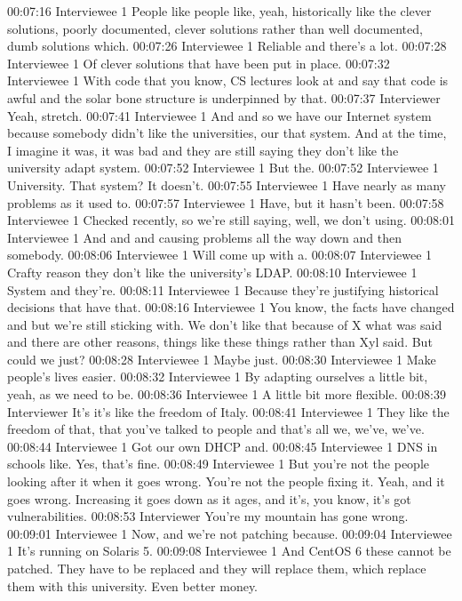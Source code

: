 00:07:16 Interviewee 1
People like people like, yeah, historically like the clever solutions, poorly documented, clever solutions rather than well documented, dumb solutions which.
00:07:26 Interviewee 1
Reliable and there's a lot.
00:07:28 Interviewee 1
Of clever solutions that have been put in place.
00:07:32 Interviewee 1
With code that you know, CS lectures look at and say that code is awful and the solar bone structure is underpinned by that.
00:07:37 Interviewer
Yeah, stretch.
00:07:41 Interviewee 1
And and so we have our Internet system because somebody didn't like the universities, our that system. And at the time, I imagine it was, it was bad and they are still saying they don't like the university adapt system.
00:07:52 Interviewee 1
But the.
00:07:52 Interviewee 1
University. That system? It doesn't.
00:07:55 Interviewee 1
Have nearly as many problems as it used to.
00:07:57 Interviewee 1
Have, but it hasn't been.
00:07:58 Interviewee 1
Checked recently, so we're still saying, well, we don't using.
00:08:01 Interviewee 1
And and and causing problems all the way down and then somebody.
00:08:06 Interviewee 1
Will come up with a.
00:08:07 Interviewee 1
Crafty reason they don't like the university's LDAP.
00:08:10 Interviewee 1
System and they're.
00:08:11 Interviewee 1
Because they're justifying historical decisions that have that.
00:08:16 Interviewee 1
You know, the facts have changed and but we're still sticking with. We don't like that because of X what was said and there are other reasons, things like these things rather than Xyl said. But could we just?
00:08:28 Interviewee 1
Maybe just.
00:08:30 Interviewee 1
Make people's lives easier.
00:08:32 Interviewee 1
By adapting ourselves a little bit, yeah, as we need to be.
00:08:36 Interviewee 1
A little bit more flexible.
00:08:39 Interviewer
It's it's like the freedom of Italy.
00:08:41 Interviewee 1
They like the freedom of that, that you've talked to people and that's all we, we've, we've.
00:08:44 Interviewee 1
Got our own DHCP and.
00:08:45 Interviewee 1
DNS in schools like. Yes, that's fine.
00:08:49 Interviewee 1
But you're not the people looking after it when it goes wrong. You're not the people fixing it. Yeah, and it goes wrong. Increasing it goes down as it ages, and it's, you know, it's got vulnerabilities.
00:08:53 Interviewer
You're my mountain has gone wrong.
00:09:01 Interviewee 1
Now, and we're not patching because.
00:09:04 Interviewee 1
It's running on Solaris 5.
00:09:08 Interviewee 1
And CentOS 6 these cannot be patched. They have to be replaced and they will replace them, which replace them with this university. Even better money.
